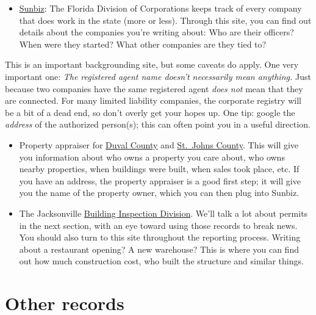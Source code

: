 \documentclass[
  11pt,
  american,
  letterpaperpaper,
  extrafontsizes,onecolumn,openright
  ]{memoir}
\providecommand{\tightlist}{%
  \setlength{\itemsep}{0pt}\setlength{\parskip}{0pt}}
\begin{document}
\begin{itemize}
\tightlist
\item
  \href{https://search.sunbiz.org/Inquiry/CorporationSearch/ByName}{Sunbiz}: The Florida Division of Corporations keeps track of every company that does work in the state (more or less). Through this site, you can find out details about the companies you're writing about: Who are their officers? When were they started? What other companies are they tied to?
\end{itemize}

This is an important backgrounding site, but some caveats do apply. One very important one: \emph{The registered agent name doesn't necessarily mean anything.} Just because two companies have the same registered agent \emph{does not} mean that they are connected. For many limited liability companies, the corporate registry will be a bit of a dead end, so don't overly get your hopes up. One tip: google the \emph{address} of the authorized person(s); this can often point you in a useful direction.

\begin{itemize}
\item
  Property appraiser for \href{https://paopropertysearch.coj.net/Basic/Search.aspx}{Duval County} and \href{https://qpublic.schneidercorp.com/Application.aspx?App=StJohnsCountyFL\&Layer=Parcels\&PageType=Search}{St.~Johns County}. This will give you information about who owns a property you care about, who owns nearby properties, when buildings were built, when sales took place, etc. If you have an address, the property appraiser is a good first step; it will give you the name of the property owner, which you can then plug into Sunbiz.
\item
  The Jacksonville \href{https://jaxepics.coj.net/}{Building Inspection Division}. We'll talk a lot about permits in the next section, with an eye toward using those records to break news. You should also turn to this site throughout the reporting process. Writing about a restaurant opening? A new warehouse? This is where you can find out how much construction cost, who built the structure and similar things.
\end{itemize}

\hypertarget{other-records}{%
\section*{Other records}\label{other-records}}
\end{document}
